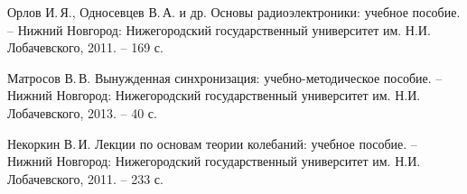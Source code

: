 \documentclass[a4paper,14pt]{extarticle}
\begin{document}
\newpage
{}
\begin{thebibliography}{99}

 Орлов И.\,Я., Односевцев В.\,А. и др. Основы радиоэлектроники: учебное пособие. -- Нижний Новгород: Нижегородский государственный университет им. Н.И. Лобачевского, 2011. -- 169 с.

 Матросов В.\,В. Вынужденная синхронизация:  учебно-методическое пособие. -- Нижний Новгород: Нижегородский государственный университет им. Н.И. Лобачевского, 2013. -- 40 с.

  Некоркин В.\,И. Лекции по основам теории колебаний: учебное пособие. -- Нижний Новгород: Нижегородский государственный университет им. Н.И. Лобачевского, 2011. -- 233 с.  

\end{thebibliography}
\end{document}
